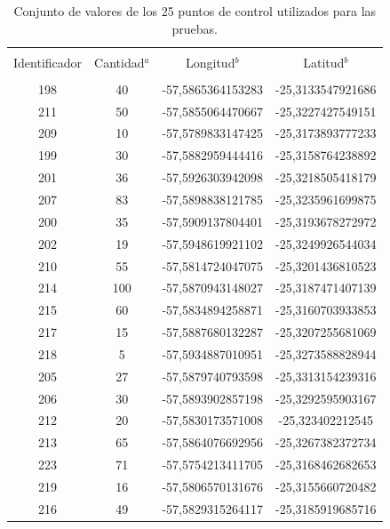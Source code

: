 \begin{table}[!htpb]
    \begin{minipage}{\textwidth}
    \centering
        \caption{\label{tab:valores-puntos-control} Conjunto de valores de los 25 puntos de control utilizados para las pruebas.}
        \begin{tabular}{c c c c}
            \hline\\
            Identificador& Cantidad$^a$& Longitud$^b$ & Latitud$^b$\\
            \hline
            \hline \\
            198 & 40 & -57,5865364153283 & -25,3133547921686 \\
            211 & 50 & -57,5855064470667 & -25,3227427549151 \\
            209 & 10 & -57,5789833147425 & -25,3173893777233 \\
            199 & 30 & -57,5882959444416 & -25,3158764238892 \\
            201 & 36 & -57,5926303942098 & -25,3218505418179 \\
            207 & 83 & -57,5898838121785 & -25,3235961699875 \\
            200 & 35 & -57,5909137804401 & -25,3193678272972 \\
            202 & 19 & -57,5948619921102 & -25,3249926544034 \\
            210 & 55 & -57,5814724047075 & -25,3201436810523 \\
            214 & 100 & -57,5870943148027 & -25,3187471407139 \\
            215 & 60 & -57,5834894258871 & -25,3160703933853 \\
            217 & 15 & -57,5887680132287 & -25,3207255681069 \\
            218 & 5 & -57,5934887010951 & -25,3273588828944 \\
            205 & 27 & -57,5879740793598 & -25,3313154239316 \\
            206 & 30 & -57,5893902857198 & -25,3292595903167 \\
            212 & 20 & -57,5830173571008 & -25,323402212545 \\
            213 & 65 & -57,5864076692956 & -25,3267382372734 \\
            223 & 71 & -57,5754213411705 & -25,3168462682653 \\
            219 & 16 & -57,5806570131676 & -25,3155660720482 \\
            216 & 49 & -57,5829315264117 & -25,3185919685716 \\

\end{tabular}
\end{minipage}
\end{table}
